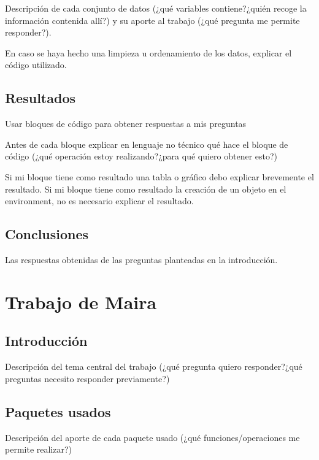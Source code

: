 \documentclass[
]{book}
\begin{document}
Descripción de cada conjunto de datos (¿qué variables contiene?¿quién recoge la información contenida allí?) y su aporte al trabajo (¿qué pregunta me permite responder?).

En caso se haya hecho una limpieza u ordenamiento de los datos, explicar el código utilizado.

\hypertarget{resultados}{%
\section{Resultados}\label{resultados}}

Usar bloques de código para obtener respuestas a mis preguntas

Antes de cada bloque explicar en lenguaje no técnico qué hace el bloque de código (¿qué operación estoy realizando?¿para qué quiero obtener esto?)

Si mi bloque tiene como resultado una tabla o gráfico debo explicar brevemente el resultado. Si mi bloque tiene como resultado la creación de un objeto en el environment, no es necesario explicar el resultado.

\hypertarget{conclusiones}{%
\section{Conclusiones}\label{conclusiones}}

Las respuestas obtenidas de las preguntas planteadas en la introducción.

\hypertarget{trabajo-de-maira}{%
\chapter{Trabajo de Maira}\label{trabajo-de-maira}}

\hypertarget{introducciuxf3n-1}{%
\section{Introducción}\label{introducciuxf3n-1}}

Descripción del tema central del trabajo (¿qué pregunta quiero responder?¿qué preguntas necesito responder previamente?)

\hypertarget{paquetes-usados-1}{%
\section{Paquetes usados}\label{paquetes-usados-1}}

Descripción del aporte de cada paquete usado (¿qué funciones/operaciones me permite realizar?)
\end{document}
